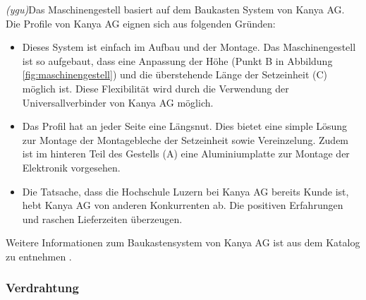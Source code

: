 \textit{(ygu)}Das Maschinengestell basiert auf dem Baukasten System von Kanya AG. Die Profile von Kanya AG eignen sich aus folgenden Gründen:
\begin{itemize}
	\item Dieses System ist einfach im Aufbau und der Montage. Das Maschinengestell ist so aufgebaut, dass eine Anpassung der Höhe (Punkt B in Abbildung \ref{fig:maschinengestell}) und die überstehende Länge der Setzeinheit (C) möglich ist. Diese Flexibilität wird durch die Verwendung der Universallverbinder von Kanya AG möglich.
	
	\item Das Profil hat an jeder Seite eine Längsnut. Dies bietet eine simple Lösung zur Montage der Montagebleche der Setzeinheit sowie Vereinzelung. Zudem ist im hinteren Teil des Gestells (A) eine Aluminiumplatte zur Montage der Elektronik vorgesehen.
	
	\item Die Tatsache, dass die Hochschule Luzern bei Kanya AG bereits Kunde ist, hebt Kanya AG von anderen Konkurrenten ab. Die positiven Erfahrungen und raschen Lieferzeiten überzeugen.
\end{itemize}
Weitere Informationen zum Baukastensystem von Kanya AG ist aus dem Katalog zu entnehmen \cite{kanya}.
\subsubsection{Verdrahtung}